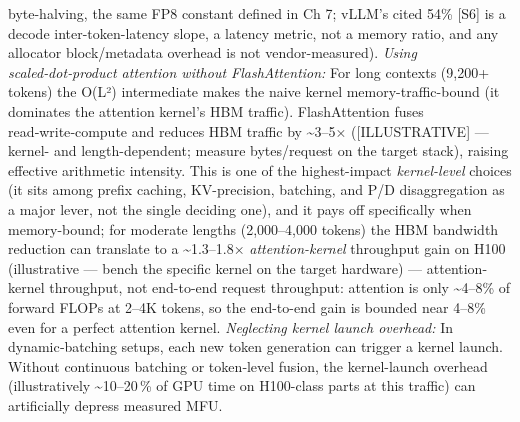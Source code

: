 byte-halving, the same FP8 constant defined in Ch 7; vLLM's cited 54\%
\mbox{{[}S6{]}} is a decode inter-token-latency slope, a latency metric, not a
memory ratio, and any allocator block/metadata overhead is not
vendor-measured). \emph{Using scaled‑dot‑product attention without
FlashAttention:} For long contexts (9,200+ tokens) the O(L²)
intermediate makes the naive kernel memory-traffic-bound (it dominates
the attention kernel's HBM traffic). FlashAttention fuses
read‑write‑compute and reduces HBM traffic by \textasciitilde3--5×
(\mbox{{[}ILLUSTRATIVE{]}} --- kernel- and length-dependent; measure
bytes/request on the target stack), raising effective arithmetic
intensity. This is one of the highest-impact \emph{kernel-level} choices
(it sits among prefix caching, KV-precision, batching, and P/D
disaggregation as a major lever, not the single deciding one), and it
pays off specifically when memory-bound; for moderate lengths
(2,000--4,000 tokens) the HBM bandwidth reduction can translate to a
\textasciitilde1.3--1.8× \emph{attention-kernel} throughput gain on H100
(illustrative --- bench the specific kernel on the target hardware) ---
attention-kernel throughput, not end-to-end request throughput:
attention is only \textasciitilde4--8\% of forward FLOPs at 2--4K
tokens, so the end-to-end gain is bounded near 4--8\% even for a perfect
attention kernel. \emph{Neglecting kernel launch overhead:} In
dynamic‑batching setups, each new token generation can trigger a kernel
launch. Without continuous batching or token‑level fusion, the
kernel-launch overhead (illustratively \textasciitilde10--20\,\% of GPU
time on H100-class parts at this traffic) can artificially depress
measured MFU.

\label{architecture-consequence}


